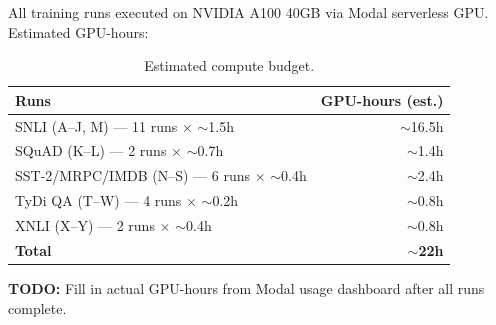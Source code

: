\documentclass[11pt,a4paper]{article}
\newcommand{\todo}[1]{\begin{mdframed}[style=todostyle]\textcolor{todocolor}{\textbf{TODO:}} #1\end{mdframed}}
\begin{document}
All training runs executed on NVIDIA A100 40GB via Modal serverless GPU. Estimated GPU-hours:

\begin{table}[h]
\centering
\begin{tabular}{@{}lr@{}}
\toprule
\textbf{Runs} & \textbf{GPU-hours (est.)} \\
\midrule
SNLI (A--J, M) --- 11 runs $\times$ $\sim$1.5h        & $\sim$16.5h \\
SQuAD (K--L) --- 2 runs $\times$ $\sim$0.7h            & $\sim$1.4h \\
SST-2/MRPC/IMDB (N--S) --- 6 runs $\times$ $\sim$0.4h  & $\sim$2.4h \\
TyDi QA (T--W) --- 4 runs $\times$ $\sim$0.2h           & $\sim$0.8h \\
XNLI (X--Y) --- 2 runs $\times$ $\sim$0.4h              & $\sim$0.8h \\
\midrule
\textbf{Total}                                           & $\sim$\textbf{22h} \\
\bottomrule
\end{tabular}
\caption{Estimated compute budget.}
\label{tab:compute}
\end{table}

\todo{Fill in actual GPU-hours from Modal usage dashboard after all runs complete.}
\end{document}
